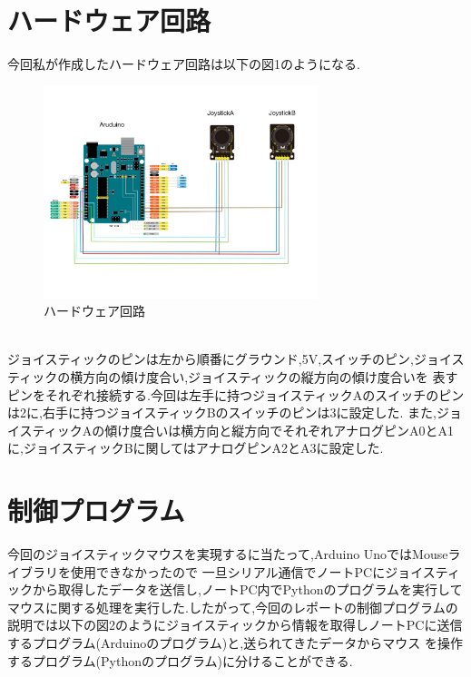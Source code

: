 \documentclass[dvipdfmx]{jarticle}
\begin{document}
\section{ハードウェア回路}
今回私が作成したハードウェア回路は以下の図1のようになる.\cite{1}\cite{6}
\begin{figure}[h]
    \centering
    \includegraphics[width=8cm]{kairo.jpg}
    \caption{ハードウェア回路}
\end{figure}
\\ジョイスティックのピンは左から順番にグラウンド,5V,スイッチのピン,ジョイスティックの横方向の傾け度合い,ジョイスティックの縦方向の傾け度合いを
表すピンをそれぞれ接続する.今回は左手に持つジョイスティックAのスイッチのピンは2に,右手に持つジョイスティックBのスイッチのピンは3に設定した.
また,ジョイスティックAの傾け度合いは横方向と縦方向でそれぞれアナログピンA0とA1に,ジョイスティックBに関してはアナログピンA2とA3に設定した.

\section{制御プログラム}
今回のジョイスティックマウスを実現するに当たって,Arduino UnoではMouseライブラリを使用できなかったので
一旦シリアル通信でノートPCにジョイスティックから取得したデータを送信し,ノートPC内でPythonのプログラムを実行して
マウスに関する処理を実行した.\cite{2}したがって,今回のレポートの制御プログラムの説明では以下の図2のようにジョイスティックから情報を取得しノートPCに送信するプログラム(Arduinoのプログラム)と,送られてきたデータからマウス
を操作するプログラム(Pythonのプログラム)に分けることができる.
\end{document}
